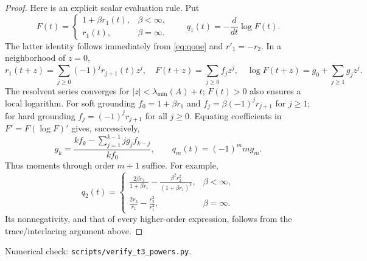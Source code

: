 \documentclass[11pt]{article}
\begin{document}
\begin{proof}
Here is an explicit scalar evaluation rule. Put
\[
 F(t)=\begin{cases}1+\beta r_1(t),&\beta<\infty,\\r_1(t),&\beta=\infty.
 \end{cases}
 \qquad q_1(t)=-\frac{d}{dt}\log F(t).
\]
The latter identity follows immediately from \eqref{eq:qone} and
$r'_1=-r_2$. In a neighborhood of $z=0$,
\[
 r_1(t+z)=\sum_{j\geq0}(-1)^j r_{j+1}(t)z^j,
 \quad F(t+z)=\sum_{j\geq0}f_jz^j,\quad
 \log F(t+z)=g_0+\sum_{j\geq1}g_jz^j.
\]
The resolvent series converges for $|z|<\lambda_{\min}(A)+t$;
$F(t)>0$ also ensures a local logarithm. For soft grounding
$f_0=1+\beta r_1$ and $f_j=\beta(-1)^jr_{j+1}$ for $j\geq1$;
for hard grounding $f_j=(-1)^jr_{j+1}$ for all $j\geq0$.
Equating coefficients in $F'=F(\log F)'$ gives, successively,
\begin{equation}\label{eq:logrecurrence}
 g_k=\frac{kf_k-\sum_{j=1}^{k-1}jg_jf_{k-j}}{kf_0},\qquad
 q_m(t)=(-1)^m m g_m.
\end{equation}
Thus moments through order $m+1$ suffice. For example,
\[
 q_2(t)=\begin{cases}
 \displaystyle\frac{2\beta r_3}{1+\beta r_1}
       -\frac{\beta^2r_2^2}{(1+\beta r_1)^2},&\beta<\infty,\\[6pt]
 \displaystyle\frac{2r_3}{r_1}-\frac{r_2^2}{r_1^2},&\beta=\infty.
 \end{cases}
\]
Its nonnegativity, and that of every higher-order expression, follows
from the trace/interlacing argument above.
\end{proof}
\noindent Numerical check: \texttt{scripts/verify\_t3\_powers.py}.
\end{document}
